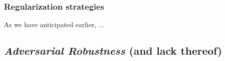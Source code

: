 \subsubsection{Regularization strategies}

As we have anticipated earlier, ...

\subsection{\textit{Adversarial Robustness} (and lack thereof)}
